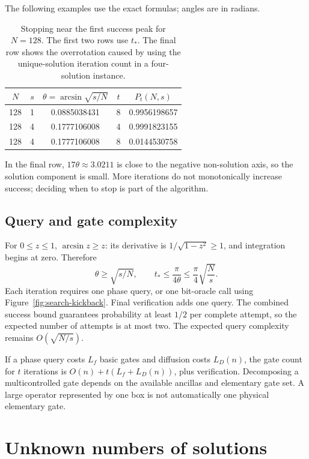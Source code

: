 \documentclass[11pt,oneside,openany]{book}
\theoremstyle{definition}
\begin{document}
The following examples use the exact formulas; angles are in radians.
\par
\begin{table}[htbp]
 \centering
 \begin{tabular}{c c c c c}
 $N$&$s$&$\theta=\arcsin\sqrt{s/N}$&$t$&$P_t(N,s)$\\\hline
 128&1&0.0885038431&8&0.9956198657\\
 128&4&0.1777106008&4&0.9991823155\\
 128&4&0.1777106008&8&0.0144530758
 \end{tabular}
 \caption{Stopping near the first success peak for $N=128$. The first two rows use $t_*$. The final row shows the overrotation caused by using the unique-solution iteration count in a four-solution instance.}
 \label{tab:search-examples}
\end{table}
\par

In the final row, $17\theta\approx3.0211$ is close to the negative non-solution axis, so the solution component is small. More iterations do not monotonically increase success; deciding when to stop is part of the algorithm.

\subsection{Query and gate complexity}

For $0\le z\le1$, $\arcsin z\ge z$: its derivative is $1/\sqrt{1-z^2}\ge1$, and integration begins at zero. Therefore
\begin{equation}
 \theta\geq\sqrt{s/N},\qquad
 t_*\leq\frac\pi{4\theta}\leq\frac\pi4\sqrt{\frac Ns}.
 \label{eq:search-query-bound}
\end{equation}
Each iteration requires one phase query, or one bit-oracle call using Figure~\ref{fig:search-kickback}. Final verification adds one query. The combined success bound guarantees probability at least $1/2$ per complete attempt, so the expected number of attempts is at most two. The expected query complexity remains $O(\sqrt{N/s})$.

If a phase query costs $L_f$ basic gates and diffusion costs $L_D(n)$, the gate count for $t$ iterations is $O(n)+t(L_f+L_D(n))$, plus verification. Decomposing a multicontrolled gate depends on the available ancillas and elementary gate set. A large operator represented by one box is not automatically one physical elementary gate.

\section{Unknown numbers of solutions}
\end{document}
